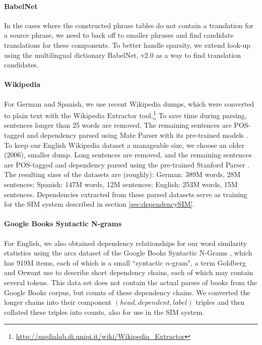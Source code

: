 \documentclass[11pt]{article}
\begin{document}
\paragraph{BabelNet} %

In the cases where the constructed phrase tables do not contain a translation
for a source phrase, we need to back off to smaller phrases and find
candidate translations for these components.  To better handle sparsity, we
extend look-up using the multilingual dictionary BabelNet, v2.0
\cite{Navigli:Ponzetto:12} as a way to find translation candidates.

\paragraph{Wikipedia} %

For German and Spanish, we use recent Wikipedia dumps, which were converted to
plain text with the Wikipedia Extractor
tool.\footnote{\url{http://medialab.di.unipi.it/wiki/Wikipedia_Extractor}} To
save time during parsing, sentences longer than 25 words are removed. The
remaining sentences are POS-tagged and dependency parsed using Mate Parser with
its pre-trained models \cite{bohnet:10,bohnet:kuhn:12,seeker:kuhn:13}. To keep
our English Wikipedia dataset a manageable size, we choose an older (2006),
smaller dump. Long sentences are removed, and
the remaining sentences are POS-tagged and dependency parsed using the
pre-trained Stanford Parser \cite{klein:manning:03,marneffe:maccartney:ea:06}.
The resulting sizes of the datasets are (roughly): German: 389M words, 28M
sentences; Spanish: 147M words, 12M sentences; English: 253M words, 15M
sentences. Dependencies extracted from these parsed datasets serve as training
for the SIM system described in section \ref{sec:dependencySIM}.

\paragraph{Google Books Syntactic N-grams}

For English, we also obtained dependency relationships for our word similarity
statistics using the arcs dataset of the Google Books Syntactic N-Grams
\cite{goldberg:orwant:13}, which has 919M items, each of which is a small
``syntactic $n$-gram", a term Goldberg and Orwant use to describe short
dependency chains, each of which may contain several tokens. This data set does
not contain the actual parses of books from the Google Books corpus, but counts
of these dependency chains. We converted the longer chains into their component
$(head,dependent,label)$ triples and then collated these triples into counts,
also for use in the SIM system.
\end{document}
